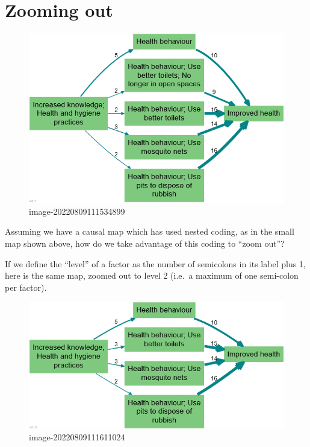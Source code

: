 \documentclass[
]{book}
\begin{document}
\hypertarget{zooming-out}{%
\section{Zooming out}\label{zooming-out}}

\begin{figure}
\centering
\includegraphics[width=6.77083in,height=\textheight]{_assets/image-20220809111534899.png}
\caption{image-20220809111534899}
\end{figure}

Assuming we have a causal map which has used nested coding, as in the small map shown above, how do we take advantage of this coding to ``zoom out''?

If we define the ``level'' of a factor as the number of semicolons in its label plus 1, here is the same map, zoomed out to level 2 (i.e.~a maximum of one semi-colon per factor).

\begin{figure}
\centering
\includegraphics[width=6.77083in,height=\textheight]{_assets/image-20220809111611024.png}
\caption{image-20220809111611024}
\end{figure}
\end{document}
